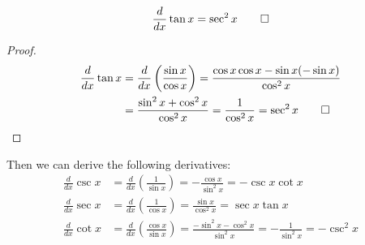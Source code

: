 \begin{theorem}
    \[\frac{d}{dx}\tan x=\sec^2 x\qedhere\]
\end{theorem}
\begin{proof}
    \begin{align*}
        \frac{d}{dx}\tan x&= \frac{d}{dx}\left(\frac{\sin x}{\cos x}\right)
        =\frac{\cos x\cos x-\sin x(-\sin x)}{\cos^2 x}  \\
        &= \frac{\sin^2 x+\cos^2 x}{\cos^2 x}=\frac{1}{\cos^2 x}
        =\sec^2 x \qedhere
    \end{align*}
\end{proof}
Then we can derive the following derivatives:
\begin{align*}
    \frac{d}{dx}\csc x &= \frac{d}{dx}\left(\frac{1}{\sin x}\right)
    =-\frac{\cos x}{\sin^2 x}=-\csc x\cot x \\
    \frac{d}{dx}\sec x &= \frac{d}{dx}\left(\frac{1}{\cos x}\right)
    =\frac{\sin x}{\cos^2 x}=\sec x\tan x \\
    \frac{d}{dx}\cot x &= \frac{d}{dx}\left(\frac{\cos x}{\sin x}\right)
    =\frac{-\sin^2 x-\cos^2 x}{\sin^2 x}=-\frac{1}{\sin^2 x}=-\csc^2 x
\end{align*}

